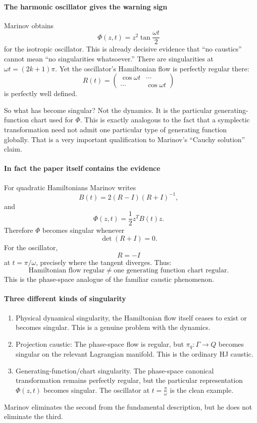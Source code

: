 \paragraph{ The harmonic oscillator gives the warning sign}
Marinov obtains
$$ \Phi(z,t) = z^2\tan\frac{\omega t}{2} $$
for the isotropic oscillator.
This is already decisive evidence that “no caustics” cannot mean “no
singularities whatsoever.”
There are singularities at $ \omega t=(2k+1)\pi.$
Yet the oscillator's Hamiltonian flow is perfectly regular there:
$$ R(t)= \begin{pmatrix} \cos\omega t & \cdots\\ \cdots & \cos\omega t \end{pmatrix} $$
is perfectly well defined.

So what has become singular?
Not the dynamics.
It is the particular generating-function chart used for \(\Phi\).
This is exactly analogous to the fact that a symplectic transformation need not
admit one particular type of generating function globally.
That is a very important qualification to Marinov's “Cauchy solution” claim.

\paragraph{In fact the paper itself contains the evidence}
For quadratic Hamiltonians Marinov writes
$$ B(t)=2(R-I)(R+I)^{-1}, $$
and
$$ \Phi(z,t)=\frac12 z^TB(t)z. $$
Therefore \(\Phi\) becomes singular whenever
$$ \det(R+I)=0. $$
For the oscillator,
$$ R=-I $$
at \(t=\pi/\omega\), precisely where the tangent diverges.
Thus:
$$ \boxed{ \text{Hamiltonian flow regular} \neq  
\text{one generating function chart regular}. } $$
This is the phase-space analogue of the familiar caustic phenomenon.

\paragraph{Three different kinds of singularity}
\begin{enumerate}
   \item Physical dynamical singularity, the Hamiltonian flow itself ceases to
       exist or becomes singular.
This is a genuine problem with the dynamics.
   \item Projection caustic: The phase-space flow is regular, but
$ \pi_q:\Gamma\rightarrow Q $ becomes singular on the relevant Lagrangian
        manifold. This is the ordinary HJ caustic.
   \item Generating-function/chart singularity.  The phase-space canonical
       transformation remains perfectly regular, but the particular
        representation $ \Phi(z,t) $ becomes singular.
The oscillator at $ t=\frac{\pi}{\omega} $ is the clean example.
\end{enumerate}
Marinov eliminates the second from the fundamental description, but he does not
eliminate the third.

